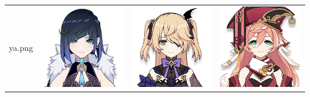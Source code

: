 \documentclass[11pt]{article}
\begin{document}
\begin{center}
\begin{tabular}{m{} m{} m{} m{}}
ya.png}  & \includegraphics[scale = 0.25]{Character_Yelan.png} &  \includegraphics[scale = 0.25]{Character_Fischl.png} & \includegraphics[scale = 0.25]{Character_Yanfei.png}\\
    \end{tabular}
\end{center}
\end{document}
